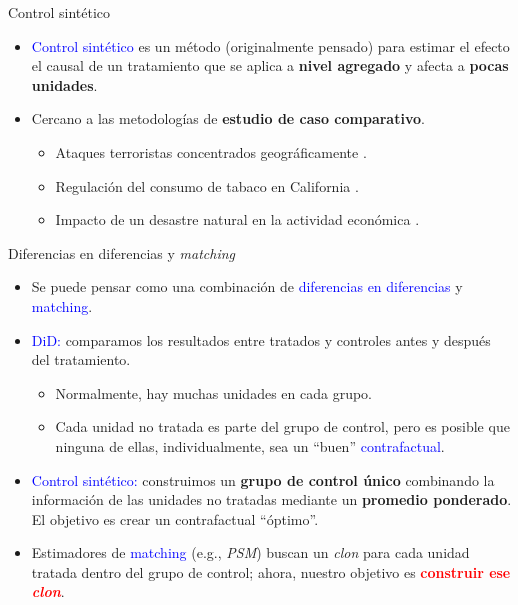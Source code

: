 \documentclass[10pt, xcolor=dvipsnames]{beamer}
\begin{document}
\begin{frame}{Control sintético}
\begin{itemize}\setlength{\itemsep}{1em}
	\item \textcolor{blue}{Control sintético} es un método (originalmente pensado) para estimar el efecto el causal de un tratamiento que se aplica a \textbf{nivel agregado} y afecta a \textbf{pocas unidades}.  \\ \vspace{0.1cm}
    \item Cercano a las metodologías de \textbf{estudio de caso comparativo}. \\ \vspace{0.1cm}	
    \begin{itemize}\setlength{\itemsep}{0.3em}
    	\item Ataques terroristas concentrados geográficamente  \citep{abadie2003economic}. \\ 	
    	\item Regulación del consumo de tabaco en California \citep{abadie2010}.
    	\item Impacto de un desastre natural en la actividad económica \citep{cavallo2013catastrophic}.	
    \end{itemize} 
\end{itemize}
\end{frame}


\begin{frame}{Diferencias en diferencias y \textit{matching}}
\begin{itemize}\setlength{\itemsep}{0.75em}
    \item Se puede pensar como una combinación de \textcolor{blue}{diferencias en diferencias} y \textcolor{blue}{matching}.
    \item \textcolor{blue}{DiD:} comparamos los resultados entre tratados y controles antes y después del tratamiento.
    \vspace{0.3em}
    \begin{itemize}\setlength{\itemsep}{0.3em}
        \item Normalmente, hay muchas unidades en cada grupo.
        \item Cada unidad no tratada es parte del grupo de control, pero es posible que ninguna de ellas, individualmente, sea un ``buen'' \textcolor{blue}{contrafactual}.
    \end{itemize}		
    \item \textcolor{blue}{Control sintético:} construimos un \textbf{grupo de control único} combinando la información de las unidades no tratadas mediante un \textbf{promedio ponderado}. El objetivo es crear un contrafactual ``óptimo''.
    \item Estimadores de \textcolor{blue}{matching} (e.g., \textit{PSM}) buscan un \textit{clon} para cada unidad tratada dentro del grupo de control; ahora, nuestro objetivo es \textcolor{red}{\textbf{construir ese \textit{clon}}}.
\end{itemize}	
\end{frame}
\end{document}
